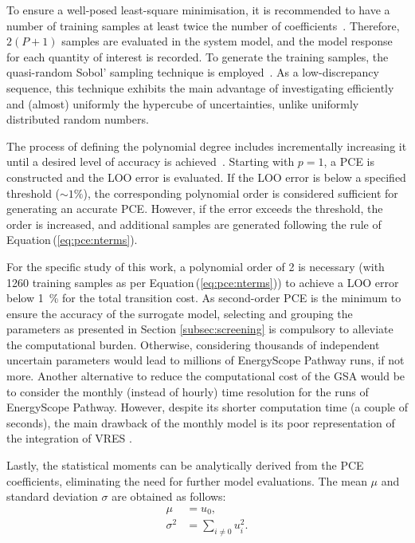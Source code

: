 To ensure a well-posed least-square minimisation, it is recommended to have a number of training samples at least twice the number of coefficients~\cite{Sudret2014}. Therefore, $2 \left( P+1 \right)$ samples are evaluated in the system model, and the model response for each quantity of interest is recorded. To generate the training samples, the quasi-random Sobol' sampling technique is employed~\cite{bratley2003implementing}. As a low-discrepancy sequence, this technique exhibits the main advantage of investigating efficiently and (almost) uniformly the hypercube of uncertainties, unlike uniformly distributed random numbers.

The process of defining the polynomial degree includes incrementally increasing it until a desired level of accuracy is achieved~\cite{coppitters2022rheia}. Starting with $p=1$, a PCE is constructed and the \gls{LOO} error is evaluated. If the \gls{LOO} error is below a specified threshold ($\sim 1\%$), the corresponding polynomial order is considered sufficient for generating an accurate PCE. However, if the error exceeds the threshold, the order is increased, and additional samples are generated following the rule of Equation\,(\ref{eq:pce:nterms}).

For the specific study of this work, a polynomial order of 2 is necessary (with 1260 training samples as per Equation\,(\ref{eq:pce:nterms})) to achieve a \gls{LOO} error below \SI{1}{\%} for the total transition cost. As second-order \gls{PCE} is the minimum to ensure the accuracy of the surrogate model, selecting and grouping the parameters as presented in Section \ref{subsec:screening} is compulsory to alleviate the computational burden. Otherwise, considering thousands of independent uncertain parameters would lead to millions of EnergyScope Pathway runs, if not more. Another alternative to reduce the computational cost of the \gls{GSA} would be to consider the monthly (instead of hourly) time resolution for the runs of EnergyScope Pathway. However, despite its shorter computation time (\ie a couple of seconds), the main drawback of the monthly model is its poor representation of the integration of \gls{VRES} \cite{limpens2024pathway}.  

Lastly, the statistical moments can be analytically derived from the PCE coefficients, eliminating the need for further model evaluations. The mean $\mu$ and standard deviation $\sigma$ are obtained as follows:
\begin{align}
\mu &= u_0,\\
\sigma^2 &= \sum_{i \neq 0 } u_{i}^2 .
\label{eq:pce:statmom}
\end{align}

